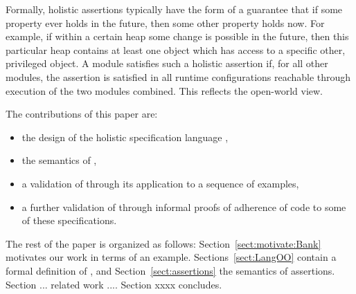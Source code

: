 Formally, holistic assertions typically have the form of a guarantee
that if some property ever holds in the future, then some other property holds now.
For example, if within a certain heap some change is possible in the future, then this particular heap contains 
at least one object which has access to a specific other, privileged object.
A module satisfies such a holistic assertion if, for all other modules,
  the assertion is satisfied  in all runtime configurations reachable through execution of the two modules combined.
  This reflects the open-world view.


\noindent The contributions of this paper are:
\begin{itemize}
\item the design of the holistic specification language \Chainmail,
\item the semantics of \Chainmail,
\item a validation of \Chainmail through its application to a sequence of examples,
\item a further validation of \Chainmail through informal proofs of adherence of code to some of these specifications.
\end{itemize}  
  
  
The rest of the paper is organized as follows: Section~\ref{sect:motivate:Bank} 
motivates our work in terms of an example. Sections~\ref{sect:LangOO} contain a formal definition of \LangOO, and Section~\ref{sect:assertions} the semantics of assertions. Section ... related work .... Section xxxx concludes.
